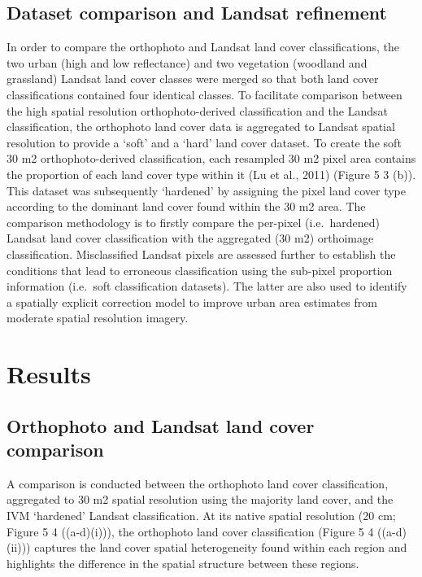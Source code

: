 \documentclass[]{book}
\begin{document}
\subsection{Dataset comparison and Landsat
refinement}\label{dataset-comparison-and-landsat-refinement}

In order to compare the orthophoto and Landsat land cover
classifications, the two urban (high and low reflectance) and two
vegetation (woodland and grassland) Landsat land cover classes were
merged so that both land cover classifications contained four identical
classes. To facilitate comparison between the high spatial resolution
orthophoto-derived classification and the Landsat classification, the
orthophoto land cover data is aggregated to Landsat spatial resolution
to provide a `soft' and a `hard' land cover dataset. To create the soft
30 m2 orthophoto-derived classification, each resampled 30 m2 pixel area
contains the proportion of each land cover type within it (Lu et al.,
2011) (Figure 5 3 (b)). This dataset was subsequently `hardened' by
assigning the pixel land cover type according to the dominant land cover
found within the 30 m2 area. The comparison methodology is to firstly
compare the per-pixel (i.e.~hardened) Landsat land cover classification
with the aggregated (30 m2) orthoimage classification. Misclassified
Landsat pixels are assessed further to establish the conditions that
lead to erroneous classification using the sub-pixel proportion
information (i.e.~soft classification datasets). The latter are also
used to identify a spatially explicit correction model to improve urban
area estimates from moderate spatial resolution imagery.

\section{Results}\label{results-1}

\subsection{Orthophoto and Landsat land cover
comparison}\label{orthophoto-and-landsat-land-cover-comparison}

A comparison is conducted between the orthophoto land cover
classification, aggregated to 30 m2 spatial resolution using the
majority land cover, and the IVM `hardened' Landsat classification. At
its native spatial resolution (20 cm; Figure 5 4 ((a-d)(i))), the
orthophoto land cover classification (Figure 5 4 ((a-d)(ii))) captures
the land cover spatial heterogeneity found within each region and
highlights the difference in the spatial structure between these
regions.
\end{document}
